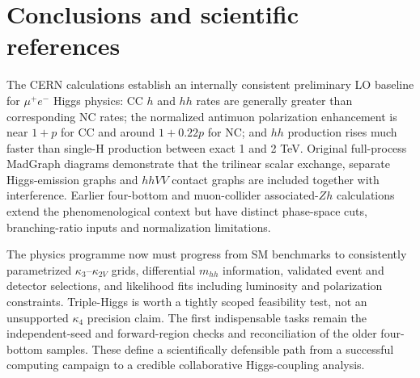 \documentclass[12pt,a4paper]{article}
\newcommand{\newnote}{\clearpage}
\begin{document}
\newnote


\section{Conclusions and scientific references}
The CERN calculations establish an internally consistent preliminary LO baseline for $\mu^+e^-$ Higgs physics: CC $h$ and $hh$ rates are generally greater than corresponding NC rates; the normalized antimuon polarization enhancement is near $1+p$ for CC and around $1+0.22p$ for NC; and $hh$ production rises much faster than single-H production between exact 1 and 2 TeV. Original full-process MadGraph diagrams demonstrate that the trilinear scalar exchange, separate Higgs-emission graphs and $hhVV$ contact graphs are included together with interference. Earlier four-bottom and muon-collider associated-$Zh$ calculations extend the phenomenological context but have distinct phase-space cuts, branching-ratio inputs and normalization limitations.

The physics programme now must progress from SM benchmarks to consistently parametrized $\kappa_3$--$\kappa_{2V}$ grids, differential $m_{hh}$ information, validated event and detector selections, and likelihood fits including luminosity and polarization constraints. Triple-Higgs is worth a tightly scoped feasibility test, not an unsupported $\kappa_4$ precision claim. The first indispensable tasks remain the independent-seed and forward-region checks and reconciliation of the older four-bottom samples. These define a scientifically defensible path from a successful computing campaign to a credible collaborative Higgs-coupling analysis.
\end{document}
